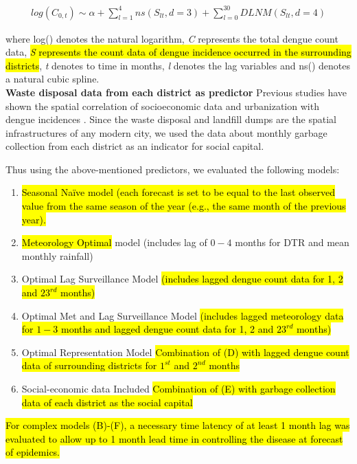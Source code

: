 \documentclass{bmcart}
\begin{document}
\begin{equation}
\begin{aligned}
\label{eq:surrounding}
log (C_{0,t}) \sim \alpha  +  \sum_{l=1}^{4} ns(S_ {lt}, d =3) + \sum_{l=0}^{30} DLNM(S_ {lt}, d = 4) 
\end{aligned}
\end{equation}


where log() denotes the natural logarithm, \textit{C} represents the total dengue count data, \hl{\textit{S} represents the count data of dengue incidence occurred in the surrounding districts}, \textit{t} denotes to time in months, \textit{l} denotes the lag variables and ns() denotes a natural cubic spline. \\

\textbf{Waste disposal data from each district as predictor} Previous studies have shown the spatial correlation of socioeconomic data and urbanization with dengue incidences \cite{mondini2008spatial,wu2009higher}. Since the waste disposal and landfill dumps are the spatial infrastructures of any modern city, we used the data about monthly garbage collection from each district as an indicator for social capital. 

Thus using the above-mentioned predictors, we evaluated the following models: 
\begin{enumerate}[label=(\Alph*)]
	\item \hl{Seasonal Na\"{i}ve model (each forecast is set to be equal to the last observed value from the same season of the year (e.g., the same month of the previous year).}
	\item \hl{Meteorology Optimal} model (includes lag of $0-4$ months for DTR and mean monthly rainfall)
	\item Optimal Lag Surveillance Model \hl{(includes lagged dengue count data for 1, 2 and $23^{rd}$ months)}
	\item Optimal Met and Lag Surveillance Model \hl{(includes lagged meteorology data for $1-3$ months and  lagged dengue count data for 1, 2 and $23^{rd}$ months)}
	\item Optimal Representation Model \hl{Combination of (D) with lagged dengue count data of surrounding districts for $1^{st}$ and $2^{nd}$ months} 
	\item Social-economic data Included \hl{Combination of (E) with garbage collection data of each district as the social capital} 
\end{enumerate}

\hl{For complex models (B)-(F), a necessary time latency of at least 1 month lag was evaluated to allow up to 1 month lead time in controlling the disease at forecast of epidemics.}
\end{document}
